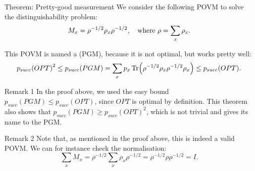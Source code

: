 \documentclass[a4paper]{article}
\begin{document}
\begin{parag}{Theorem: Pretty-good measurement}
    We consider the following POVM to solve the distinguishability problem: 
    \[M_x = \rho^{-1/2} \rho_x \rho^{-1/2}, \quad \text{where } \rho = \sum_{x} \rho_x.\]

    This POVM is named a  (PGM), because it is not optimal, but works pretty well: 
    \[p_{succ}\left(OPT\right)^2 \leq p_{succ}\left(PGM\right) = \sum_{x} p_x \Tr\left(\rho^{-1/2} \rho_x \rho^{-1/2} \rho_x\right) \leq p_{succ}\left(OPT\right).\]

    \begin{subparag}{Remark 1}
        In the proof above, we used the easy bound $p_{succ}\left(PGM\right) \leq p_{succ}\left(OPT\right)$, since $OPT$ is optimal by definition. This theorem also shows that $p_{succ}\left(PGM\right) \geq p_{succ}\left(OPT\right)^2$, which is not trivial and gives its name to the PGM.
    \end{subparag}
    
    \begin{subparag}{Remark 2}
        Note that, as mentioned in the proof above, this is indeed a valid POVM. We can for instance check the normalisation:
        \[\sum_{x} M_x = \rho^{-1/2} \sum_{x} \rho_x \rho^{-1/2} = \rho^{-1/2} \rho \rho^{-1/2} = I.\]
    \end{subparag}
\end{parag}
\end{document}
